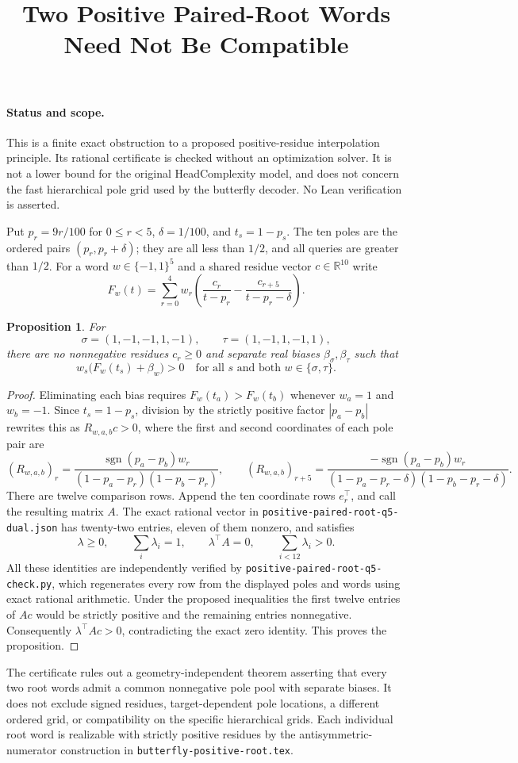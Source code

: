 \documentclass[11pt]{article}
\title{Two Positive Paired-Root Words Need Not Be Compatible}
\author{}\date{}
\newtheorem{proposition}{Proposition}
\begin{document}
\maketitle
\paragraph{Status and scope.}
This is a finite exact obstruction to a proposed positive-residue
interpolation principle. Its rational certificate is checked without
an optimization solver. It is not a lower bound for the original
HeadComplexity model, and does not concern the fast hierarchical pole
grid used by the butterfly decoder. No Lean verification is asserted.

Put $p_r=9r/100$ for $0\leq r<5$, $\delta=1/100$, and
$t_s=1-p_s$. The ten poles are the ordered pairs
$(p_r,p_r+\delta)$; they are all less than $1/2$, and all queries
are greater than $1/2$. For a word $w\in\{-1,1\}^5$ and a shared
residue vector $c\in\mathbb R^{10}$ write
\[
 F_w(t)=\sum_{r=0}^4 w_r\left(
       \frac{c_r}{t-p_r}-\frac{c_{r+5}}{t-p_r-\delta}\right).
\]
\begin{proposition}
For
\[
 \sigma=(1,-1,-1,1,-1),\qquad
 \tau=(1,-1,1,-1,1),
\]
there are no nonnegative residues $c_r\geq0$ and separate real
biases $\beta_\sigma,\beta_\tau$ such that
\[
 w_s\bigl(F_w(t_s)+\beta_w\bigr)>0
 \quad\text{for all }s\text{ and both }w\in\{\sigma,\tau\}.
\]
\end{proposition}
\begin{proof}
Eliminating each bias requires $F_w(t_a)>F_w(t_b)$ whenever
$w_a=1$ and $w_b=-1$. Since $t_s=1-p_s$, division by the
strictly positive factor $|p_a-p_b|$ rewrites this as $R_{w,a,b}c>0$,
where the first and second coordinates of each pole pair are
\[
 (R_{w,a,b})_r=
 \frac{\operatorname{sgn}(p_a-p_b)w_r}
 {(1-p_a-p_r)(1-p_b-p_r)},\qquad
 (R_{w,a,b})_{r+5}=
 \frac{-\operatorname{sgn}(p_a-p_b)w_r}
 {(1-p_a-p_r-\delta)(1-p_b-p_r-\delta)}.
\]
There are twelve comparison rows. Append the ten coordinate rows
$e_r^\top$, and call the resulting matrix $A$. The exact rational
vector in \texttt{positive-paired-root-q5-dual.json} has twenty-two
entries, eleven of them nonzero, and satisfies
\[
 \lambda\geq0,\qquad \sum_i\lambda_i=1,\qquad
 \lambda^\top A=0,\qquad \sum_{i<12}\lambda_i>0.
\]
All these identities are independently verified by
\texttt{positive-paired-root-q5-check.py}, which regenerates every
row from the displayed poles and words using exact rational arithmetic.
Under the proposed inequalities the first twelve entries of $Ac$
would be strictly positive and the remaining entries nonnegative.
Consequently $\lambda^\top Ac>0$, contradicting the exact zero
identity. This proves the proposition.
\end{proof}

The certificate rules out a geometry-independent theorem asserting
that every two root words admit a common nonnegative pole pool with
separate biases. It does not exclude signed residues, target-dependent
pole locations, a different ordered grid, or compatibility on the
specific hierarchical grids. Each individual root word is realizable
with strictly positive residues by the antisymmetric-numerator
construction in \texttt{butterfly-positive-root.tex}.
\end{document}
